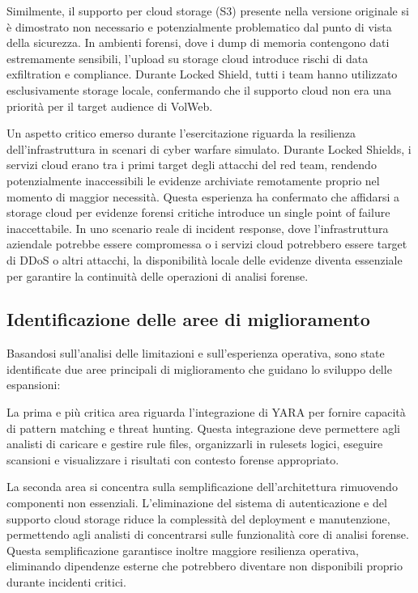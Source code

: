 Similmente, il supporto per cloud storage (S3) presente nella versione originale si è dimostrato non necessario e potenzialmente problematico dal punto di vista della sicurezza. In ambienti forensi, dove i dump di memoria contengono dati estremamente sensibili, l'upload su storage cloud introduce rischi di data exfiltration e compliance. Durante Locked Shield, tutti i team hanno utilizzato esclusivamente storage locale, confermando che il supporto cloud non era una priorità per il target audience di VolWeb.

Un aspetto critico emerso durante l'esercitazione riguarda la resilienza dell'infrastruttura in scenari di cyber warfare simulato. Durante Locked Shields, i servizi cloud erano tra i primi target degli attacchi del red team, rendendo potenzialmente inaccessibili le evidenze archiviate remotamente proprio nel momento di maggior necessità. Questa esperienza ha confermato che affidarsi a storage cloud per evidenze forensi critiche introduce un single point of failure inaccettabile. In uno scenario reale di incident response, dove l'infrastruttura aziendale potrebbe essere compromessa o i servizi cloud potrebbero essere target di DDoS o altri attacchi, la disponibilità locale delle evidenze diventa essenziale per garantire la continuità delle operazioni di analisi forense.

\subsection{Identificazione delle aree di miglioramento}

Basandosi sull'analisi delle limitazioni e sull'esperienza operativa, sono state identificate due aree principali di miglioramento che guidano lo sviluppo delle espansioni:

La prima e più critica area riguarda l'integrazione di YARA per fornire capacità di pattern matching e threat hunting. Questa integrazione deve permettere agli analisti di caricare e gestire rule files, organizzarli in rulesets logici, eseguire scansioni e visualizzare i risultati con contesto forense appropriato.

La seconda area si concentra sulla semplificazione dell'architettura rimuovendo componenti non essenziali. L'eliminazione del sistema di autenticazione e del supporto cloud storage riduce la complessità del deployment e manutenzione, permettendo agli analisti di concentrarsi sulle funzionalità core di analisi forense. Questa semplificazione garantisce inoltre maggiore resilienza operativa, eliminando dipendenze esterne che potrebbero diventare non disponibili proprio durante incidenti critici.

